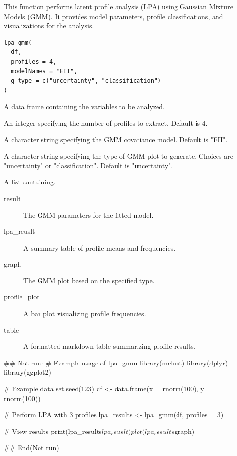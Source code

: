 \documentclass[a4paper]{book}
\begin{document}
%
\begin{Description}
This function performs latent profile analysis (LPA) using Gaussian Mixture Models (GMM).
It provides model parameters, profile classifications, and visualizations for the analysis.
\end{Description}
%
\begin{Usage}
\begin{verbatim}
lpa_gmm(
  df,
  profiles = 4,
  modelNames = "EII",
  g_type = c("uncertainty", "classification")
)
\end{verbatim}
\end{Usage}
%
\begin{Arguments}
\begin{ldescription}
\item[\code{df}] A data frame containing the variables to be analyzed.

\item[\code{profiles}] An integer specifying the number of profiles to extract. Default is 4.

\item[\code{modelNames}] A character string specifying the GMM covariance model. Default is "EII".

\item[\code{g\_type}] A character string specifying the type of GMM plot to generate.
Choices are "uncertainty" or "classification". Default is "uncertainty".
\end{ldescription}
\end{Arguments}
%
\begin{Value}
A list containing:
\begin{description}

\item[result] The GMM parameters for the fitted model.
\item[lpa\_reuslt] A summary table of profile means and frequencies.
\item[graph] The GMM plot based on the specified type.
\item[profile\_plot] A bar plot visualizing profile frequencies.
\item[table] A formatted markdown table summarizing profile results.

\end{description}

\end{Value}
%
\begin{Examples}
\begin{ExampleCode}
\#\# Not run: 
# Example usage of lpa_gmm
library(mclust)
library(dplyr)
library(ggplot2)

# Example data
set.seed(123)
df <- data.frame(x = rnorm(100), y = rnorm(100))

# Perform LPA with 3 profiles
lpa_results <- lpa_gmm(df, profiles = 3)

# View results
print(lpa_results$lpa_reuslt)
plot(lpa_results$graph)

## End(Not run)
\end{ExampleCode}
\end{Examples}
\end{document}
